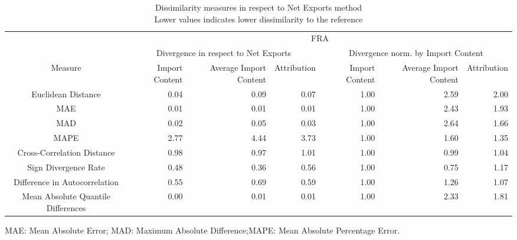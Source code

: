 \begin{table}[t]
\caption*{
{\large Dissimilarity measures in respect to Net Exports method} \\ 
{\small Lower values indicates lower dissimilarity to the reference}
} 
\fontsize{15.0pt}{18.0pt}\selectfont
\begin{tabular*}{\linewidth}{@{\extracolsep{\fill}}crrrrrr}
\toprule
 & \multicolumn{6}{c}{FRA} \\ 
\cmidrule(lr){2-7}
 & \multicolumn{3}{c}{Divergence in respect to Net Exports} & \multicolumn{3}{c}{Divergence norm. by Import Content} \\ 
\cmidrule(lr){2-4} \cmidrule(lr){5-7}
Measure & Import Content & Average Import Content & Attribution & Import Content & Average Import Content & Attribution \\ 
\midrule\addlinespace[2.5pt]
Euclidean Distance & 0.04 & 0.09 & 0.07 & 1.00 & 2.59 & 2.00 \\ 
MAE & 0.01 & 0.01 & 0.01 & 1.00 & 2.43 & 1.93 \\ 
MAD & 0.02 & 0.05 & 0.03 & 1.00 & 2.64 & 1.66 \\ 
MAPE & 2.77 & 4.44 & 3.73 & 1.00 & 1.60 & 1.35 \\ 
Cross-Correlation Distance & 0.98 & 0.97 & 1.01 & 1.00 & 0.99 & 1.04 \\ 
Sign Divergence Rate & 0.48 & 0.36 & 0.56 & 1.00 & 0.75 & 1.17 \\ 
Difference in Autocorrelation & 0.55 & 0.69 & 0.59 & 1.00 & 1.26 & 1.07 \\ 
Mean Absolute Quantile Differences & 0.00 & 0.01 & 0.01 & 1.00 & 2.33 & 1.81 \\ 
\bottomrule
\end{tabular*}
\begin{minipage}{\linewidth}
MAE: Mean Absolute Error; MAD: Maximum Absolute Difference;MAPE: Mean Absolute Percentage Error.\\
\end{minipage}
\end{table}

